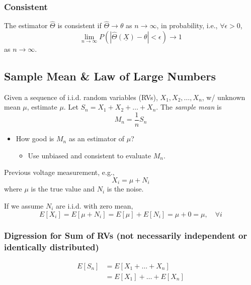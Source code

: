\subsubsection{Consistent}
\begin{definition}
    The estimator $\hat{\Theta}$ is consistent if $\hat{\Theta} \rightarrow \theta$ as $n \to \infty$, in probability, i.e., $\forall \epsilon > 0$,
    \begin{equation}
        \lim_{n \to \infty} P(|\hat{\Theta}(\underline{X}) - \theta| < \epsilon) \rightarrow 1
    \end{equation}
    as $n \to \infty$.
\end{definition}

\subsection{Sample Mean \& Law of Large Numbers}
\begin{definition}
    Given a sequence of i.i.d. random variables (RVs), $X_1, X_2, \dots, X_n$, w/ unknown mean $\mu$, estimate $\mu$. Let $S_n = X_1 + X_2 + \dots + X_n$.  
    The \textit{sample mean} is  
    \[
    M_n = \frac{1}{n} S_n
    \]
    
    \begin{itemize}
        \item How good is $M_n$ as an estimator of $\mu$?
        \begin{itemize}
            \item Use unbiased and consistent to evaluate $M_n$.
        \end{itemize}
    \end{itemize}
\end{definition}

\begin{example}
    Previous voltage measurement, e.g.,  
    \[
    X_i = \mu + N_i
    \]
    where $\mu$ is the true value and $N_i$ is the noise.
    \vspace{1em}

    If we assume $N_i$ are i.i.d. with zero mean,  
    \[
    E[X_i] = E[\mu + N_i] = E[\mu] + E[N_i] = \mu + 0 = \mu, \quad \forall i
    \]
\end{example}

\subsubsection{Digression for Sum of RVs (not necessarily independent or identically distributed)}
\begin{derivation} 
    \begin{align*}
        E[S_n] &= E[X_1 + \dots + X_n] \\
        &= E[X_1] + \dots + E[X_n]
    \end{align*}
\end{derivation}

